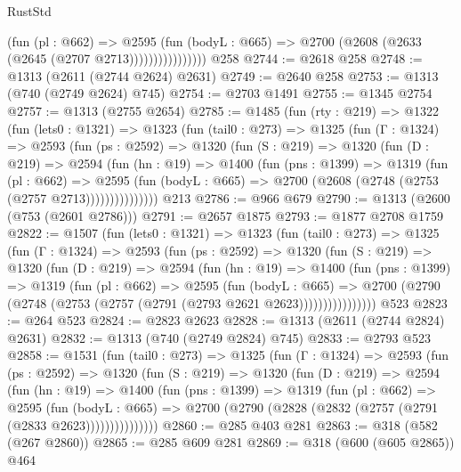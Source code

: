 \begin{lexlean}{RustStd}
\begin{coremodule}
                        (fun (pl : @662) =>
                        @2595
                          (fun (bodyL : @665) =>
                          @2700 (@2608 (@2633 (@2645 (@2707 @2713))))))))))))))))
    @258
@2744 := @2618 @258
@2748 := @1313 (@2611 (@2744 @2624) @2631)
@2749 := @2640 @258
@2753 := @1313 (@740 (@2749 @2624) @745)
@2754 := @2703 @1491
@2755 := @1345 @2754
@2757 := @1313 (@2755 @2654)
@2785 := @1485
    (fun (rty : @219) =>
    @1322
      (fun (lets0 : @1321) =>
      @1323
        (fun (tail0 : @273) =>
        @1325
          (fun (Γ : @1324) =>
          @2593
            (fun (ps : @2592) =>
            @1320
              (fun (S : @219) =>
              @1320
                (fun (D : @219) =>
                @2594
                  (fun (hn : @19) =>
                  @1400
                    (fun (pns : @1399) =>
                    @1319
                      (fun (pl : @662) =>
                      @2595
                        (fun (bodyL : @665) =>
                        @2700 (@2608 (@2748 (@2753 (@2757 @2713)))))))))))))))
    @213
@2786 := @966 @679
@2790 := @1313 (@2600 (@753 (@2601 @2786)))
@2791 := @2657 @1875
@2793 := @1877 @2708 @1759
@2822 := @1507
    (fun (lets0 : @1321) =>
    @1323
      (fun (tail0 : @273) =>
      @1325
        (fun (Γ : @1324) =>
        @2593
          (fun (ps : @2592) =>
          @1320
            (fun (S : @219) =>
            @1320
              (fun (D : @219) =>
              @2594
                (fun (hn : @19) =>
                @1400
                  (fun (pns : @1399) =>
                  @1319
                    (fun (pl : @662) =>
                    @2595
                      (fun (bodyL : @665) =>
                      @2700 (@2790 (@2748 (@2753 (@2757 (@2791 (@2793 @2621 @2623))))))))))))))))
    @523
@2823 := @264 @523
@2824 := @2823 @2623
@2828 := @1313 (@2611 (@2744 @2824) @2631)
@2832 := @1313 (@740 (@2749 @2824) @745)
@2833 := @2793 @523
@2858 := @1531
    (fun (tail0 : @273) =>
    @1325
      (fun (Γ : @1324) =>
      @2593
        (fun (ps : @2592) =>
        @1320
          (fun (S : @219) =>
          @1320
            (fun (D : @219) =>
            @2594
              (fun (hn : @19) =>
              @1400
                (fun (pns : @1399) =>
                @1319
                  (fun (pl : @662) =>
                  @2595
                    (fun (bodyL : @665) =>
                    @2700 (@2790 (@2828 (@2832 (@2757 (@2791 (@2833 @2623)))))))))))))))
@2860 := @285 @403 @281
@2863 := @318 (@582 (@267 @2860))
@2865 := @285 @609 @281
@2869 := @318 (@600 (@605 @2865)) @464

\end{coremodule}
\end{lexlean}
